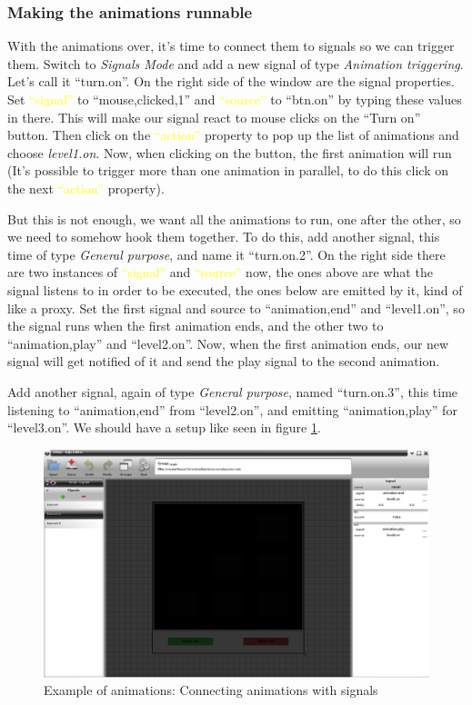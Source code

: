 \documentclass[a4paper]{profusion}
\newcommand{\GUIEditable}[1]{\textcolor{yellow}{#1}} %
\begin{document}
  \subsubsection{Making the animations runnable}

With the animations over, it's time to connect them to signals so we
can trigger them. Switch to \emph{Signals Mode} and add a new signal
of type \emph{Animation triggering}. Let's call it ``turn.on''. On the
right side of the window are the signal properties. Set
\GUIEditable{``signal''} to ``mouse,clicked,1'' and
\GUIEditable{``source''} to ``btn.on'' by typing these values in
there. This will make our signal react to mouse clicks on the ``Turn
on'' button. Then click on the \GUIEditable{``action''} property to
pop up the list of animations and choose \emph{level1.on}. Now, when
clicking on the button, the first animation will run (It's possible to
trigger more than one animation in parallel, to do this click on the
next \GUIEditable{``action''} property).

But this is not enough, we want all the animations to run, one after
the other, so we need to somehow hook them together. To do this, add
another signal, this time of type \emph{General purpose}, and name it
``turn.on.2''. On the right side there are two instances of
\GUIEditable{``signal''} and \GUIEditable{``source''} now, the ones
above are what the signal listens to in order to be executed, the ones
below are emitted by it, kind of like a proxy. Set the first signal
and source to ``animation,end'' and ``level1.on'', so the signal runs
when the first animation ends, and the other two to ``animation,play''
and ``level2.on''. Now, when the first animation ends, our new signal
will get notified of it and send the play signal to the second
animation.

Add another signal, again of type \emph{General purpose}, named
``turn.on.3'', this time listening to ``animation,end'' from
``level2.on'', and emitting ``animation,play'' for ``level3.on''. We
should have a setup like seen in figure \ref{fig:anim1_signal_level2}.

\begin{figure}[h!]
  \centering
  \includegraphics[width=1.0\textwidth]{examples/anim1_signal_level2.png}
  \caption{Example of animations: Connecting animations with signals}
  \label{fig:anim1_signal_level2}
\end{figure}
\end{document}
